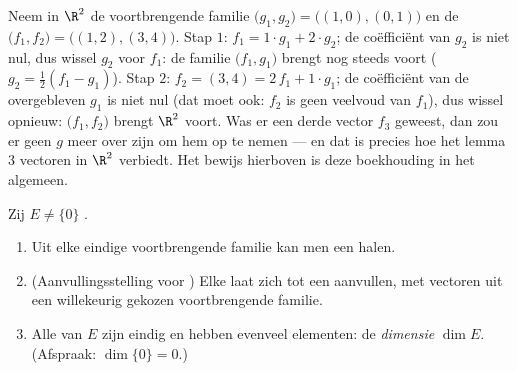 \begin{example}
\label{ex:b1:findim:exchangerun}
Neem in $\R^2$ de voortbrengende familie $\bigl(g_1, g_2\bigr) =
\bigl((1,0), (0,1)\bigr)$ en de  $\bigl(f_1,
f_2\bigr) = \bigl((1,2), (3,4)\bigr)$. Stap $1$: $f_1 = 1\cdot g_1
+ 2\cdot g_2$; de coëfficiënt van $g_2$ is niet nul, dus wissel
$g_2$ voor $f_1$: de familie $\bigl(f_1, g_1\bigr)$ brengt nog
steeds voort ($g_2 = \frac12(f_1 - g_1)$). Stap $2$: $f_2 = (3,4)
= 2\,f_1 + 1\cdot g_1$; de coëfficiënt van de overgebleven $g_1$
is niet nul (dat moet ook: $f_2$ is geen veelvoud van $f_1$), dus
wissel opnieuw: $\bigl(f_1, f_2\bigr)$ brengt $\R^2$ voort. Was er
een derde  vector $f_3$ geweest, dan zou er geen $g$ meer
over zijn om hem op te nemen --- en dat is precies hoe het lemma
$3$  vectoren in $\R^2$ verbiedt. Het bewijs hierboven is
deze boekhouding in het algemeen.
\end{example}

\begin{theorem}\label{thm:b1:findim:bases}
Zij $E \neq \{0\}$ .
\begin{enumerate}
  \item Uit elke eindige voortbrengende familie kan men een 
        halen.
  \item (Aanvullingsstelling voor ) Elke  laat zich tot een 
        aanvullen, met vectoren uit een willekeurig gekozen
        voortbrengende familie.
  \item Alle  van $E$ zijn eindig en hebben evenveel
        elementen: de \emph{dimensie} $\dim E$. (Afspraak:
        $\dim\{0\} = 0$.)
\end{enumerate}
\end{theorem}

